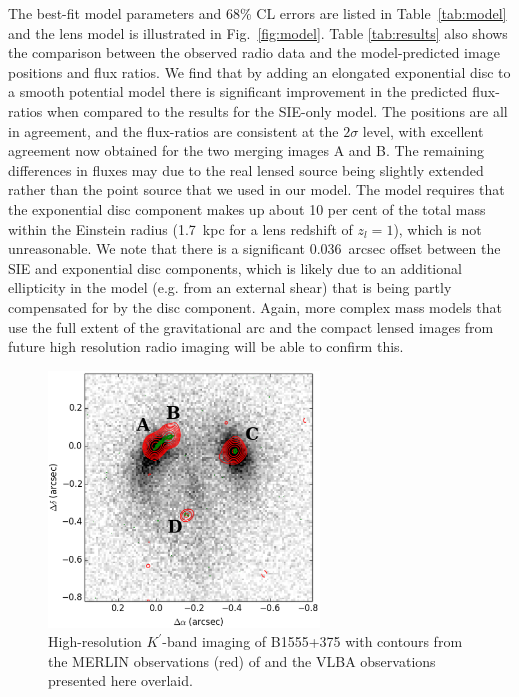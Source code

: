 \documentclass[a4paper,fleqn,usenatbib,useAMS]{mnras}
\begin{document}
The best-fit model parameters and 68\% CL errors are listed in Table~\ref{tab:model} and the lens model is illustrated in Fig.~\ref{fig:model}. Table \ref{tab:results} also shows the comparison between the observed radio data and the model-predicted image positions and flux ratios. We find that by adding an elongated exponential disc to a smooth potential model there is significant improvement in the predicted flux-ratios when compared to the results for the SIE-only model. 
The positions are all in agreement, and the flux-ratios are consistent at the $2\sigma$ level, with excellent agreement now obtained for the two merging images A and B. The remaining differences in fluxes may due to the real lensed source being slightly extended rather than the point source that we used in our model. The model requires that the exponential disc component makes up about 10 per cent of the total mass within the Einstein radius (1.7~kpc for a lens redshift of $z_l = 1$), which is not unreasonable. We note that there is a significant 0.036~arcsec offset between the SIE and exponential disc components, which is likely due to an additional ellipticity in the model (e.g. from an external shear) that is being partly compensated for by the disc component. Again, more complex mass models that use the full extent of the gravitational arc and the compact lensed images from future high resolution radio imaging will be able to confirm this.

\begin{figure}
\includegraphics[width=72mm]{fig2_twocontour_g.eps}
\caption{High-resolution $K^\prime$-band imaging of B1555+375 with contours from the MERLIN observations (red) of \citet{Marlow99} and the VLBA observations presented here overlaid.}
\label{fig:merlin}
\end{figure}
\end{document}
